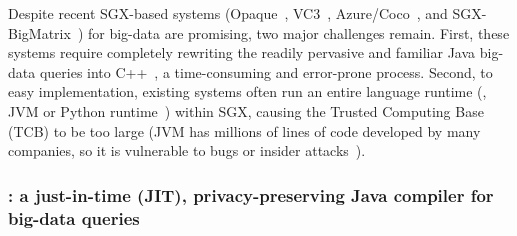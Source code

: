 Despite recent SGX-based systems (Opaque~\cite{opaque:nsdi17}, 
VC3~\cite{vc3:sp15}, Azure/Coco~\cite{azure:coco}, and 
SGX-BigMatrix~\cite{bigmatrix:ccs17}) for big-data are promising, two major 
challenges remain. First, these systems require completely rewriting the 
readily pervasive and familiar Java big-data queries 
into C++~\cite{opaque:nsdi17,vc3:sp15,azure:coco}, a time-consuming and 
error-prone process. Second, to easy implementation, existing systems often 
run an entire language runtime (\eg, JVM or Python 
runtime~\cite{bigmatrix:ccs17}) within SGX, causing the Trusted Computing Base 
(TCB) to be too large (JVM has millions of lines of code developed
by many companies, so it is vulnerable to bugs or insider 
attacks~\cite{top-threats}).

\vspace{-.15in}
\subsubsection{\maat: a just-in-time (JIT), privacy-preserving Java compiler 
for big-data queries} 
\label{sec:ift-problem}\vspace{-.075in}


